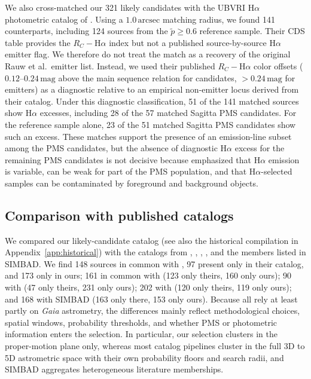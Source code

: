 \documentclass{aa}
\begin{document}
We also cross-matched our 321 likely candidates with the UBVRI H$\alpha$ photometric catalog of \citet{2010AA...511A..25R}. Using a $1.0\,\mathrm{arcsec}$ matching radius, we found 141 counterparts, including 124 sources from the $\tilde{p}\geq0.6$ reference sample. Their CDS table provides the $R_C-$H$\alpha$ index but not a published source-by-source H$\alpha$ emitter flag. We therefore do not treat the match as a recovery of the original Rauw et al.\ emitter list. Instead, we used their published $R_C-$H$\alpha$ color offsets ($0.12$--$0.24\,\mathrm{mag}$ above the main sequence relation for candidates, $>0.24\,\mathrm{mag}$ for emitters) as a diagnostic relative to an empirical non-emitter locus derived from their catalog. Under this diagnostic classification, 51 of the 141 matched sources show H$\alpha$ excesses, including 28 of the 57 matched Sagitta PMS candidates. For the reference sample alone, 23 of the 51 matched Sagitta PMS candidates show such an excess. These matches support the presence of an emission-line subset among the PMS candidates, but the absence of diagnostic H$\alpha$ excess for the remaining PMS candidates is not decisive because \citet{2010AA...511A..25R} emphasized that H$\alpha$ emission is variable, can be weak for part of the PMS population, and that H$\alpha$-selected samples can be contaminated by foreground and background objects.

\subsection{Comparison with published catalogs}
We compared our likely-candidate catalog (see also the historical compilation in Appendix~\ref{app:historical}) with the catalogs from \citet{2020AA...640A...1C}, \citet{2021ApJ...923..129J}, \citet{2022ApJS..262....7H}, \citet{2024arXiv240305143H}, and the members listed in SIMBAD\@. We find 148 sources in common with \citet{2020AA...640A...1C}, 97 present only in their catalog, and 173 only in ours; 161 in common with \citet{2021ApJ...923..129J} (123 only theirs, 160 only ours); 90 with \citet{2022ApJS..262....7H} (47 only theirs, 231 only ours); 202 with \citet{2024arXiv240305143H} (120 only theirs, 119 only ours); and 168 with SIMBAD (163 only there, 153 only ours). Because all rely at least partly on \textit{Gaia} astrometry, the differences mainly reflect methodological choices, spatial windows, probability thresholds, and whether PMS or photometric information enters the selection. In particular, our selection clusters in the proper-motion plane only, whereas most catalog pipelines cluster in the full 3D to 5D astrometric space with their own probability floors and search radii, and SIMBAD aggregates heterogeneous literature memberships.
\end{document}
